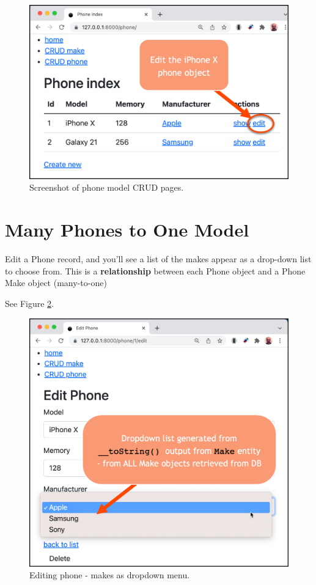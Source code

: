 \documentclass[a4paperpaper,openright]{book}
\begin{document}
\begin{figure}
\centering
\includegraphics[width=1\textwidth,height=\textheight]{./tex2pdf.-564b08cce17d66dc/2a799b2bfbfc4e78e4f9c5ad9ef60b948c664efb.png}
\caption{Screenshot of phone model CRUD pages.\label{phone_index}}
\end{figure}

\newpage

\hypertarget{many-phones-to-one-model}{%
\section{Many Phones to One Model}\label{many-phones-to-one-model}}

Edit a Phone record, and you'll see a list of the makes appear as a
drop-down list to choose from. This is a \textbf{relationship} between
each Phone object and a Phone Make object (many-to-one)

See Figure \ref{phone_edit}.

\begin{figure}
\centering
\includegraphics[width=1\textwidth,height=\textheight]{./tex2pdf.-564b08cce17d66dc/f35d637c8c0cd9aaebc6b1e793c0ee9634295185.png}
\caption{Editing phone - makes as dropdown menu.\label{phone_edit}}
\end{figure}
\end{document}
